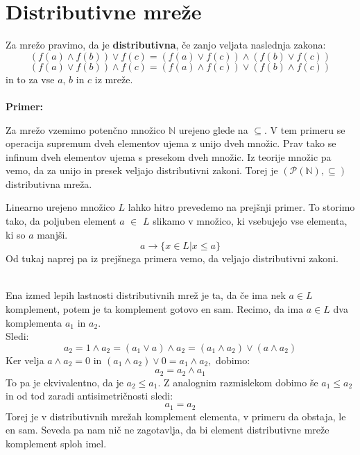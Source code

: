 \documentclass[a4paper]{article}
\newcounter{environment:definition_counter}
\newcounter{environment:theorem_counter}
\newcounter{environment:statement_counter}
\newcounter{example:example_counter}
\newenvironment{example}
{\textbf{Primer:}\\}
{\setcounter{example:example_counter}{0}}
\newenvironment{example_case}
{\refstepcounter{example:example_counter} \arabic{example:example_counter}.}
{\\}
\begin{document}
\section{Distributivne mreže}
Za mrežo pravimo, da je \textbf{distributivna}, če zanjo veljata naslednja zakona:
$$ (f(a) \land f(b)) \lor f(c) = (f(a) \lor f(c)) \land (f(b) \lor f(c))$$
$$ (f(a) \lor f(b)) \land f(c) = (f(a) \land f(c)) \lor (f(b) \land f(c))$$
in to za vse $a$, $b$ in $c$ iz mreže. \\ \\
\begin{example}
\begin{example_case}
Za mrežo vzemimo potenčno množico $\mathbb{N}$ urejeno glede na $\subseteq$. V tem primeru se operacija supremum dveh elementov ujema z unijo dveh množic. Prav tako se infinum dveh elementov ujema s presekom dveh množic. Iz teorije množic pa vemo, da za unijo in presek veljajo distributivni zakoni. Torej je $(\mathcal{P}(\mathbb{N}),\subseteq)$ distributivna mreža.
\end{example_case}
\begin{example_case}
Linearno urejeno množico $L$ lahko hitro prevedemo na prejšnji primer. To storimo tako, da poljuben element $a$ $\in$ $L$ slikamo v množico, ki vsebujejo vse elementa, ki so $a$ manjši.
$$ a \rightarrow \{ x \in L  |  x \leq a \}$$
Od tukaj naprej pa iz prejšnega primera vemo, da veljajo distributivni zakoni.
\end{example_case}\\
Ena izmed lepih lastnosti distributivnih mrež je ta, da če ima nek $a \in L$ komplement, potem je ta komplement gotovo en sam. Recimo, da ima $a \in L$ dva komplementa $a_{1}$ in $a_{2}$.\\
Sledi:
$$ a_{2} = 1 \land a_{2} = (a_{1} \lor a) \land a_{2} = (a_{1} \land a_{2}) \lor (a \land a_{2}) $$
Ker velja $a \land a_{2} = 0$ in $(a_{1} \land a_{2}) \lor 0 = a_{1} \land a_{2},$ dobimo:
$$ a_{2} = a_{2} \land a_{1} $$ 
To pa je ekvivalentno, da je $a_{2} \leq a_{1}$. Z analognim razmislekom dobimo še $a_{1} \leq a_{2}$ in od tod zaradi antisimetričnosti sledi:
$$ a_{1} = a_{2} $$
Torej je v distributivnih mrežah komplement elementa, v primeru da obstaja, le en sam. Seveda pa nam nič ne zagotavlja, da bi element distributivne mreže komplement sploh imel.
\end{example}
\end{document}
